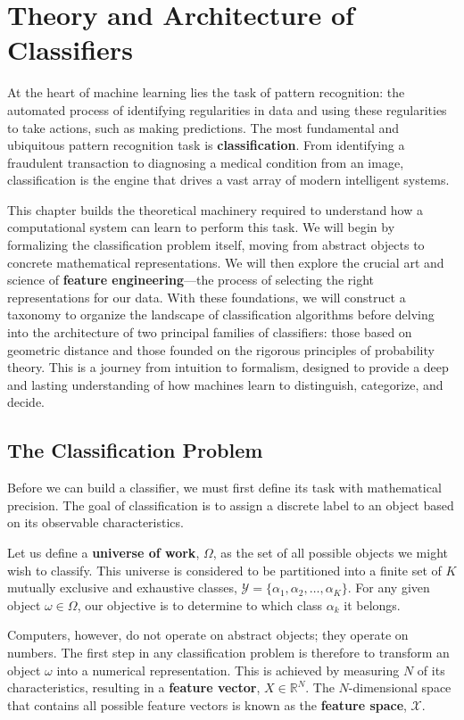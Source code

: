 \chapter{Theory and Architecture of Classifiers}
\label{chap:classifiers}

At the heart of machine learning lies the task of pattern recognition: the automated process of identifying regularities in data and using these regularities to take actions, such as making predictions. The most fundamental and ubiquitous pattern recognition task is \textbf{classification}. From identifying a fraudulent transaction to diagnosing a medical condition from an image, classification is the engine that drives a vast array of modern intelligent systems.

This chapter builds the theoretical machinery required to understand how a computational system can learn to perform this task. We will begin by formalizing the classification problem itself, moving from abstract objects to concrete mathematical representations. We will then explore the crucial art and science of \textbf{feature engineering}—the process of selecting the right representations for our data. With these foundations, we will construct a taxonomy to organize the landscape of classification algorithms before delving into the architecture of two principal families of classifiers: those based on geometric distance and those founded on the rigorous principles of probability theory. This is a journey from intuition to formalism, designed to provide a deep and lasting understanding of how machines learn to distinguish, categorize, and decide.

\section{The Classification Problem}
\label{sec:classification_problem}
Before we can build a classifier, we must first define its task with mathematical precision. The goal of classification is to assign a discrete label to an object based on its observable characteristics.

Let us define a \textbf{universe of work}, $\Omega$, as the set of all possible objects we might wish to classify. This universe is considered to be partitioned into a finite set of $K$ mutually exclusive and exhaustive classes, $\mathcal{Y} = \{\alpha_1, \alpha_2, \dots, \alpha_K\}$. For any given object $\omega \in \Omega$, our objective is to determine to which class $\alpha_k$ it belongs.

Computers, however, do not operate on abstract objects; they operate on numbers. The first step in any classification problem is therefore to transform an object $\omega$ into a numerical representation. This is achieved by measuring $N$ of its characteristics, resulting in a \textbf{feature vector}, $X \in \mathbb{R}^N$. The $N$-dimensional space that contains all possible feature vectors is known as the \textbf{feature space}, $\mathcal{X}$.

